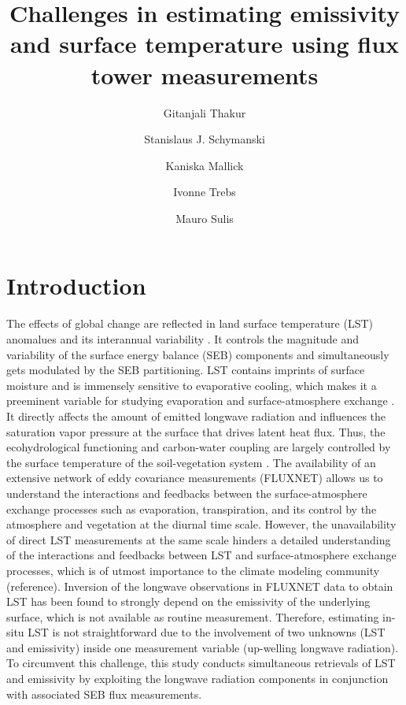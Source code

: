 \documentclass[fleqn,10pt]{wlscirep}
\title{ Challenges in estimating emissivity and surface temperature using flux tower measurements}
\author[1,*]{Gitanjali Thakur}
\author[1,*]{ Stanislaus J. Schymanski}
\author[1]{Kaniska Mallick }
\author[1]{Ivonne Trebs}
\author[1]{Mauro Sulis}
\affil[1]{Luxembourg Institute of Science and Technology, ERIN, Belvaux, L-4422, Luxembourg}
\affil[*]{gitanjali.thakur@list.lu}
\affil[*]{stanislaus.schymanski@list.lu}
\begin{document}
\flushbottom
\maketitle
%
%
\thispagestyle{empty}


\section*{Introduction}

The effects of global change are reflected in land surface temperature (LST) anomalues and its interannual variability \cite{rowell2005scenario}. It controls the magnitude and variability of the surface energy balance (SEB) components and simultaneously gets modulated by the SEB partitioning\cite{mallick2015reintroducing,timmermans2007intercomparison}. LST contains imprints of surface moisture and is immensely sensitive to evaporative cooling, which makes it a preeminent variable for studying evaporation and surface-atmosphere exchange \cite{mallick2018critical,trebs2021role,kustas2009advances}. It directly affects the amount of emitted longwave radiation and influences the saturation vapor pressure at the surface that drives latent heat flux. Thus, the ecohydrological functioning and carbon-water coupling are largely controlled by the surface temperature of the soil-vegetation system \cite{still2021imaging}.
 The availability of an extensive network of eddy covariance measurements (FLUXNET) allows us to understand the interactions and feedbacks between the surface-atmosphere exchange processes such as evaporation, transpiration, and its control by the atmosphere and vegetation at the diurnal time scale. However, the unavailability of direct LST measurements at the same scale hinders a detailed understanding of the interactions and feedbacks between LST and surface-atmosphere exchange processes, which is of utmost importance to the climate modeling community (reference). Inversion of the longwave observations in FLUXNET data to obtain LST has been found to strongly depend on the emissivity of the underlying surface\cite{mallick2018bridging}, which is not available as routine measurement. Therefore, estimating in-situ LST is not straightforward due to the involvement of two unknowns (LST and emissivity) inside one measurement variable (up-welling longwave radiation). To circumvent this challenge, this study conducts simultaneous retrievals of LST and emissivity by exploiting the longwave radiation components in conjunction with associated SEB flux measurements.
\end{document}
